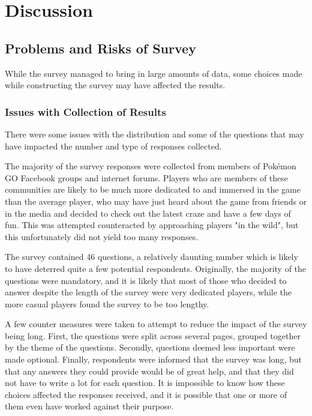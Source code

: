 
\chapter{Discussion}
\label{chapter:discussion}

\section{Problems and Risks of Survey}
\label{sec:problems-with-survey}

While the survey managed to bring in large amounts of data, some choices made while constructing the survey may have affected the results.

\subsection{Issues with Collection of Results}

There were some issues with the distribution and some of the questions that may have impacted the number and type of responses collected.

The majority of the survey responses were collected from members of Pokémon GO Facebook groups and internet forums. Players who are members of these communities are likely to be much more dedicated to and immersed in the game than the average player, who may have just heard about the game from friends or in the media and decided to check out the latest craze and have a few days of fun. This was attempted counteracted by approaching players "in the wild", but this unfortunately did not yield too many responses.

The survey contained 46 questions, a relatively daunting number which is likely to have deterred quite a few potential respondents. Originally, the majority of the questions were mandatory, and it is likely that most of those who decided to answer despite the length of the survey were very dedicated players, while the more casual players found the survey to be too lengthy.

A few counter measures were taken to attempt to reduce the impact of the survey being long. First, the questions were split across several pages, grouped together by the theme of the questions. Secondly, questions deemed less important were made optional. Finally, respondents were informed that the survey was long, but that any answers they could provide would be of great help, and that they did not have to write a lot for each question. It is impossible to know how these choices affected the responses received, and it is possible that one or more of them even have worked against their purpose.

